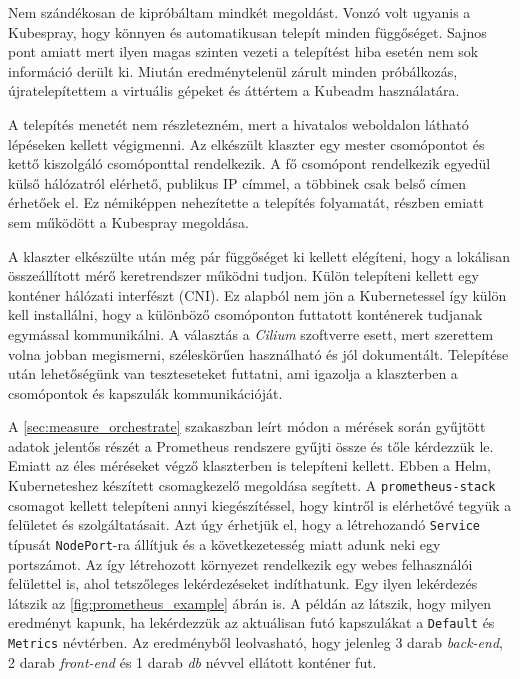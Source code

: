 Nem szándékosan de kipróbáltam mindkét megoldást. Vonzó volt ugyanis a Kubespray, hogy könnyen és automatikusan telepít minden függőséget. Sajnos pont amiatt mert ilyen magas szinten vezeti a telepítést hiba esetén nem sok információ derült ki. Miután eredménytelenül zárult minden próbálkozás, újratelepítettem a virtuális gépeket és áttértem a Kubeadm használatára. 

A telepítés menetét nem részletezném, mert a hivatalos weboldalon látható lépéseken kellett végigmenni. Az elkészült klaszter egy mester csomópontot és kettő kiszolgáló csomóponttal rendelkezik. A fő csomópont rendelkezik egyedül külső hálózatról elérhető, publikus IP címmel, a többinek csak belső címen érhetőek el. Ez némiképpen nehezítette a telepítés folyamatát, részben emiatt sem működött a Kubespray megoldása. 

A klaszter elkészülte után még pár függőséget ki kellett elégíteni, hogy a lokálisan összeállított mérő keretrendszer működni tudjon. Külön telepíteni kellett egy konténer hálózati interfészt (CNI). Ez alapból nem jön a Kubernetessel így külön kell installálni, hogy a különböző csomóponton futtatott konténerek tudjanak egymással kommunikálni. A választás a \textit{Cilium} szoftverre esett, mert szerettem volna jobban megismerni, széleskörűen használható és jól dokumentált. Telepítése után lehetőségünk van teszteseteket futtatni, ami igazolja a klaszterben a csomópontok és kapszulák kommunikációját. 

A \ref{sec:measure_orchestrate} szakaszban leírt módon a mérések során gyűjtött adatok jelentős részét a Prometheus rendszere gyűjti össze és tőle kérdezzük le. Emiatt az éles méréseket végző klaszterben is telepíteni kellett. Ebben a Helm, Kuberneteshez készített csomagkezelő megoldása segített. A \verb+prometheus-stack+ csomagot kellett telepíteni annyi kiegészítéssel, hogy kintről is elérhetővé tegyük a felületet és szolgáltatásait. Azt úgy érhetjük el, hogy a létrehozandó \verb+Service+  típusát \verb+NodePort+-ra állítjuk és a következetesség miatt adunk neki egy portszámot. Az így létrehozott környezet rendelkezik egy webes felhasználói felülettel is, ahol tetszőleges lekérdezéseket indíthatunk. Egy ilyen lekérdezés látszik az \ref{fig:prometheus_example} ábrán is. A példán az látszik, hogy milyen eredményt kapunk, ha lekérdezzük az aktuálisan futó kapszulákat a \verb+Default+ és \verb+Metrics+ névtérben. Az eredményből leolvasható, hogy jelenleg 3 darab \textit{back-end}, 2 darab \textit{front-end} és 1 darab \textit{db} névvel ellátott konténer fut. \\

